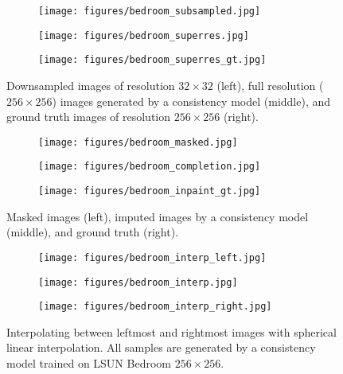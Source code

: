 \begin{appendices}
\begin{figure}
    \centering
    \begin{subfigure}[b]{0.11\textwidth}
        \texttt{[image: figures/bedroom\_subsampled.jpg]}
    \end{subfigure}\hfill
    \begin{subfigure}[b]{0.77\textwidth}
        \texttt{[image: figures/bedroom\_superres.jpg]}
    \end{subfigure}\hfill
    \begin{subfigure}[b]{0.11\textwidth}
        \texttt{[image: figures/bedroom\_superres\_gt.jpg]}
    \end{subfigure}\hfill
    \caption{Downsampled images of resolution $32\times 32$ (left), full resolution ($256\times 256$) images generated by a consistency model (middle), and ground truth images of resolution $256\times 256$ (right).}
    \label{fig:bedroom_superres}
\end{figure}

\begin{figure}
    \centering
    \begin{subfigure}[b]{0.11\textwidth}
        \texttt{[image: figures/bedroom\_masked.jpg]}
    \end{subfigure}\hfill
    \begin{subfigure}[b]{0.77\textwidth}
        \texttt{[image: figures/bedroom\_completion.jpg]}
    \end{subfigure}\hfill
    \begin{subfigure}[b]{0.11\textwidth}
        \texttt{[image: figures/bedroom\_inpaint\_gt.jpg]}
    \end{subfigure}\hfill
    \caption{Masked images (left), imputed images by a consistency model (middle), and ground truth (right).}
    \label{fig:bedroom_inpainting}
\end{figure}

\begin{figure}
    \centering
    \begin{subfigure}[b]{0.11\textwidth}
        \texttt{[image: figures/bedroom\_interp\_left.jpg]}
    \end{subfigure}\hfill
    \begin{subfigure}[b]{0.77\textwidth}
        \texttt{[image: figures/bedroom\_interp.jpg]}
    \end{subfigure}\hfill
    \begin{subfigure}[b]{0.11\textwidth}
        \texttt{[image: figures/bedroom\_interp\_right.jpg]}
    \end{subfigure}\hfill
    \caption{Interpolating between leftmost and rightmost images with spherical linear interpolation. All samples are generated by a consistency model trained on LSUN Bedroom $256\times 256$.}
    \label{fig:bedroom_interp}
\end{figure}



\end{appendices}
